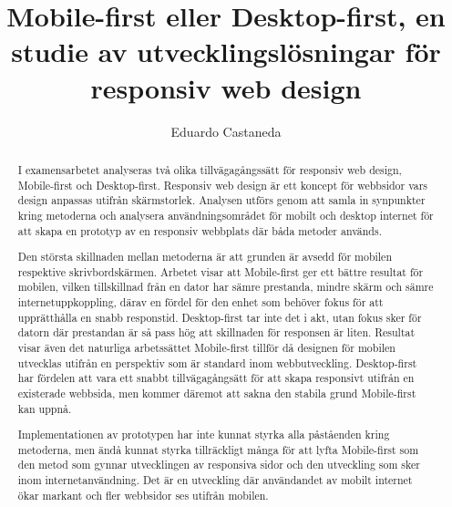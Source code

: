 \documentclass[11pt]{article}
\title{Mobile-first eller Desktop-first, en studie av utvecklingslösningar för responsiv web design}
\author{Eduardo Castaneda}
\newcommand\blankpage{%
    \null
    \thispagestyle{empty}%
    \addtocounter{page}{-1}%
    \newpage}
\begin{document}
\maketitle
\thispagestyle{empty}
\afterpage{\blankpage}
\newpage


\begin{abstract}
I examensarbetet analyseras två olika tillvägagångssätt för responsiv web design, Mobile-first och Desktop-first. Responsiv web design är ett koncept för webbsidor vars design anpassas utifrån skärmstorlek. Analysen utförs genom att samla in synpunkter kring metoderna och analysera användningsområdet för mobilt och desktop internet för att skapa en prototyp av en responsiv webbplats där båda metoder används.

Den största skillnaden mellan metoderna är att grunden är avsedd för mobilen respektive skrivbordskärmen. Arbetet visar att Mobile-first ger ett bättre resultat för mobilen, vilken tillskillnad från en dator har sämre prestanda, mindre skärm och sämre internetuppkoppling,
därav en fördel för den enhet som behöver fokus för att upprätthålla en snabb responstid. Desktop-first tar inte det i akt, utan fokus sker för datorn där prestandan är så pass hög att skillnaden för responsen är liten. Resultat visar även det naturliga arbetssättet Mobile-first tillför då designen för mobilen utvecklas utifrån en perspektiv som är standard inom webbutveckling. Desktop-first har fördelen att vara ett snabbt tillvägagångsätt för att skapa responsivt utifrån en existerade webbsida, men kommer däremot att sakna den stabila grund Mobile-first kan uppnå.

Implementationen av prototypen har inte kunnat styrka alla påståenden kring metoderna, men ändå kunnat styrka tillräckligt många för att lyfta Mobile-first som den metod som gynnar utvecklingen av responsiva sidor och den utveckling som sker inom internetanvändning. Det är en utveckling där användandet av mobilt internet ökar markant och fler webbsidor ses utifrån mobilen. 

\end{abstract}
\end{document}
